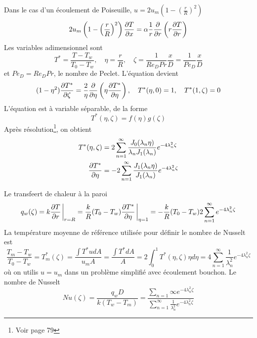 \documentclass[a4paper,11pt]{report}
\newcommand{\recip}[1]{\frac{1}{#1}}
\begin{document}
      Dans le cas d'un écoulement de Poiseuille, $u = 2u_m \left(1 - \left(\frac{r}{R}\right)^2\right)$
      \begin{equation}
        2u_m \left(1 - \left(\frac{r}{R}\right)^2\right) \pdv{T}{x} = \alpha \recip{r} \pdv{r} \left(r\pdv{T}{r}\right)
      \end{equation}
      Les variables adimensionnel sont
      \begin{equation}
        T^\ast = \frac{T-T_w}{T_0 - T_w}, \quad \eta = \frac{r}{R}, \quad \zeta = \recip{Re_D Pr} \frac{x}{D} = \recip{Pe_D} \frac{x}{D}
      \end{equation}
      et $Pe_D = Re_D Pr$, le nombre de Peclet. L'équation devient
      \begin{equation}
        (1-\eta^2) \pdv{T^\ast}{\zeta} = \frac{2}{\eta} \pdv{\eta} \left(\eta \pdv{T^\ast}{\eta}\right), \quad T^\ast (\eta, 0) = 1, \quad T^\ast (1, \zeta) = 0
      \end{equation}
      L'équation est à variable séparable, de la forme
      \begin{equation}
        T^\ast (\eta, \zeta) = f(\eta)g(\zeta)
      \end{equation}
      Après résolution\footnote{Voir page 79}, on obtient
      \begin{equation}
        \begin{aligned}
          T^\ast (\eta, \zeta) &= 2 \sum_{n=1}^\infty \frac{J_0 (\lambda_n \eta)}{\lambda_n J_1(\lambda_n)} e^{-4\lambda_n^2 \zeta}\\
          \pdv{T^\ast}{\eta} &= -2 \sum_{n=1}^\infty \frac{J_1(\lambda_n \eta)}{J_1(\lambda_n)} e^{-4\lambda_n^2 \zeta}
        \end{aligned}
      \end{equation}

      Le transfeert de chaleur à la paroi
      \begin{equation}
        q_w(\zeta) = k \pdv{T}{r}\eval_{r=R} = \frac{k}{R}(T_0 - T_w) \pdv{T^\ast}{\eta} \eval_{\eta = 1} = -\frac{k}{R} (T_0 - T_w) 2 \sum_{n=1}^\infty e^{-4 \lambda_n^2 \zeta}
      \end{equation}
      La température moyenne de référence utilisée pour définir le nombre de Nusselt est
      \begin{equation}
        \frac{T_m - T_w}{T_0 - T_w} = T_m^\ast(\zeta) = \frac{\int T^\ast u dA}{u_m A} = \frac{\int T^\ast dA}{A} = 2 \int_0^1 T^\ast(\eta, \zeta) \eta d\eta = 4 \sum_{n=1}^{\infty} \recip{\lambda_n^2}e^{-4 \lambda_n^2 \zeta}
      \end{equation}
      où on utilis $u=u_m$ dans un problème simplifié avec écoulement bouchon. Le nombre de Nusselt
      \begin{equation}
        Nu(\zeta) = \frac{q_w D}{k (T_w - T_m)} = \frac{\sum_{n=1}{\infty} e^{-4 \lambda_n^2 \zeta}}{\sum_{n=1}^\infty \recip{\lambda_n^2} e^{-4 \lambda_n^2 \zeta}}
      \end{equation}
\end{document}
